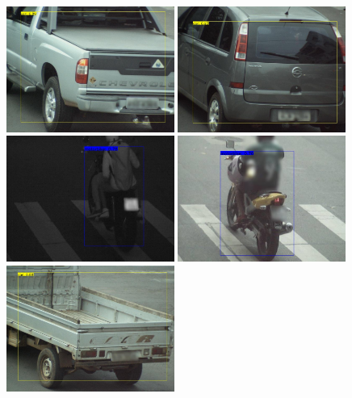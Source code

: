 \documentclass[12pt,oneside]{memoir}
\begin{document}
\begin{figure}[!htbp]
\centering
  \includegraphics[width=0.49\textwidth]{matfmaster/yolo/v4/stylegan_augmentation/car_0.jpg}
  \includegraphics[width=0.49\textwidth]{matfmaster/yolo/v4/stylegan_augmentation/car_1.jpg}
  \includegraphics[width=0.49\textwidth]{matfmaster/yolo/v4/stylegan_augmentation/motorbike_0.jpg}
  \includegraphics[width=0.49\textwidth]{matfmaster/yolo/v4/stylegan_augmentation/motorbike_1.jpg}
  \includegraphics[width=0.49\textwidth]{matfmaster/yolo/v4/stylegan_augmentation/truck_0.jpg}

\end{figure}
\end{document}
